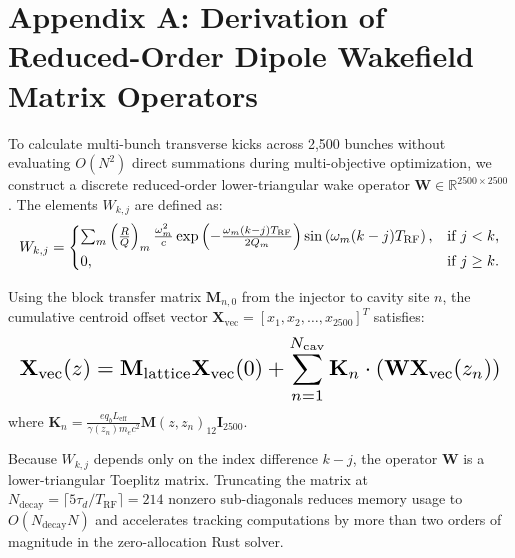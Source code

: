 \section{Appendix A: Derivation of Reduced-Order Dipole Wakefield Matrix Operators}
\label{appendix:reduced_order_wake}

To calculate multi-bunch transverse kicks across 2,500 bunches without evaluating $O(N^2)$ direct summations during multi-objective optimization, we construct a discrete reduced-order lower-triangular wake operator $\mathbf{W} \in \mathbb{R}^{2500 \times 2500}$. The elements $W_{k,j}$ are defined as:
\begin{equation}
\resizebox{\columnwidth}{!}{$\displaystyle
W_{k,j} = \begin{cases}
\sum_m \left(\frac{R}{Q}\right)_m \frac{\omega_m^2}{c} \exp\left(-\frac{\omega_m (k-j) T_{\text{RF}}}{2 Q_m}\right) \sin\left(\omega_m (k-j) T_{\text{RF}}\right), & \text{if } j < k, \\
0, & \text{if } j \ge k.
\end{cases}
$}
\label{eq:reduced_wake_matrix_def}
\end{equation}

Using the block transfer matrix $\mathbf{M}_{n,0}$ from the injector to cavity site $n$, the cumulative centroid offset vector $\mathbf{X}_{\text{vec}} = [x_1, x_2, \dots, x_{2500}]^T$ satisfies:
\begin{equation}
\resizebox{\columnwidth}{!}{$\displaystyle
\mathbf{X}_{\text{vec}}(z) = \mathbf{M}_{\text{lattice}} \mathbf{X}_{\text{vec}}(0) + \sum_{n=1}^{N_{\text{cav}}} \mathbf{K}_n \cdot \left( \mathbf{W} \mathbf{X}_{\text{vec}}(z_n) \right)
$}
\label{eq:matrix_bbu_system}
\end{equation}
where $\mathbf{K}_n = \frac{e q_b L_{\text{eff}}}{\gamma(z_n) m_e c^2} \mathbf{M}(z, z_n)_{12} \mathbf{I}_{2500}$. 

Because $W_{k,j}$ depends only on the index difference $k-j$, the operator $\mathbf{W}$ is a lower-triangular Toeplitz matrix. Truncating the matrix at $N_{\text{decay}} = \lceil 5 \tau_d / T_{\text{RF}} \rceil = 214$ nonzero sub-diagonals reduces memory usage to $O(N_{\text{decay}} N)$ and accelerates tracking computations by more than two orders of magnitude in the zero-allocation Rust solver.
